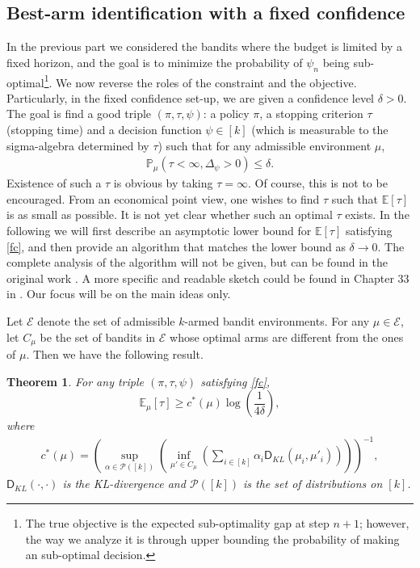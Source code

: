 \documentclass[letterpaper,10pt,openright,openany]{book}
\numberwithin{equation}{section}
\theoremstyle{plain}
\newtheorem{Th}{Theorem}[section]
\theoremstyle{definition}
\def\E{{\mathbb E}}
\def\P{{\mathbb P}}
\begin{document}
\subsection{Best-arm identification with a fixed confidence}

In the previous part we considered the bandits where the budget is limited by a fixed horizon, and the goal is to minimize the probability of $\psi_n$ being sub-optimal\footnote{The true objective is the expected sub-optimality gap at step $n+1$; however, the way we analyze it is through upper bounding the probability of making an sub-optimal decision.}. We now reverse the roles of the constraint and the objective. Particularly, in the fixed confidence set-up, we are given a confidence level $\delta>0$. The goal is find a good triple $(\pi, \tau, \psi)$: a policy $\pi$, a stopping criterion $\tau$ (stopping time) and a decision function $\psi\in [k]$ (which is measurable to the sigma-algebra determined by $\tau$) such that for any admissible environment $\mu$, 
\begin{align}
\P_{\mu}\left(\tau<\infty, \Delta_\psi>0\right)\leq \delta. \label{fc}
\end{align}
Existence of such a $\tau$ is obvious by taking $\tau=\infty$. Of course, this is not to be encouraged. From an economical point view, one wishes to find $\tau$ such that $\E[\tau]$ is as small as possible. It is not yet clear whether such an optimal $\tau$ exists. In the following we will first describe an asymptotic lower bound for $\E[\tau]$ satisfying \eqref{fc}, and then provide an algorithm that matches the lower bound as $\delta\to 0$. The complete analysis of the algorithm will not be given, but can be found in the original work \cite{garivier2016optimal}. A more specific and readable sketch could be found in Chapter 33 in \cite{lattimore2018bandit}. Our focus will be on the main ideas only. 

Let $\mathcal E$ denote the set of admissible $k$-armed bandit environments. For any $\mu\in\mathcal E$, let $C_\mu$ be the set of bandits in $\mathcal E$ whose optimal arms are different from the ones of $\mu$. Then we have the following result. 

\begin{Th}\label{ba:lb}
For any triple $(\pi, \tau, \psi)$ satisfying \eqref{fc}, $$\E_\mu[\tau]\geq c^*(\mu)\log\left(\frac{1}{4\delta}\right),$$ where
\begin{align*}
c^*(\mu)=\left(\sup_{\alpha\in\mathcal P([k])}\left(\inf_{\mu'\in C_\mu}\left(\sum_{i\in [k]}\alpha_i\mathsf D_{KL}(\mu_i, \mu'_i)\right)\right)\right)^{-1},
\end{align*}
$\mathsf D_{KL}(\cdot, \cdot)$ is the KL-divergence and $\mathcal P([k])$ is the set of distributions on $[k]$. 
\end{Th}
\end{document}
